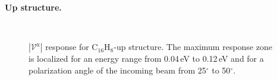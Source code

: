 \documentclass[prb,11pt,tightenlines,twocolumn,aps]{revtex4-1}
\begin{document}
\textbf{Up structure.}

\begin{figure}[t]
    \centering
    \\
    \caption{$|\mathcal{V}^{\mathrm{x}}|$ response for C$_{16}$H$_{8}$-up
    structure. The maximum response zone is localized for an energy range from
    0.04\,eV to 0.12\,eV and for a polarization angle of the
    incoming beam from 25$^{\circ}$ to 50$^{\circ}$.}
    \label{fig:up-3d-1}
\end{figure}
\end{document}
